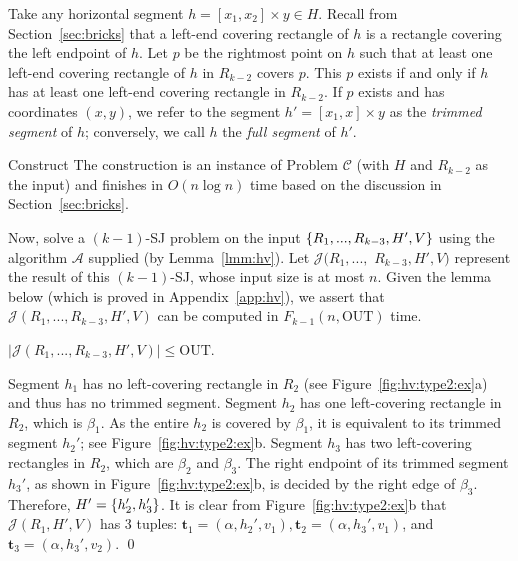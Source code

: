\documentclass[sigconf]{acmart}
\def\vgap{\vspace{0mm}}
\def\extraspacing{\vspace{1.5mm} \noindent}
\def\A{\mathcal{A}}
\def\J{\mathcal{J}}
\def\out{\mathrm{OUT}}
\begin{document}
{{{\extraspacing {\bf Set $\bm{H'}$.} Take any horizontal segment $h = [x_1, x_2] \times y \in H$. Recall from Section~\ref{sec:bricks} that a left-end covering rectangle of $h$ is a rectangle covering the left endpoint of $h$. 
Let $p$ be the rightmost point on $h$ such that at least one left-end covering rectangle of $h$ in $R_{k-2}$ covers $p$. This $p$ exists if and only if $h$ has at least one left-end covering rectangle in $R_{k-2}$. If $p$ exists and has coordinates $(x, y)$, we refer to the segment $h' = [x_1, x] \times y$ as the {\em trimmed segment} of $h$; conversely, we call $h$ the {\em full segment} of $h'$.

\vgap 

Construct
The construction is an instance of Problem $\mathscr{C}$ (with $H$ and $R_{k-2}$ as the input) and finishes in $O(n \log n)$ time based on the discussion in Section~\ref{sec:bricks}.

\vgap 

Now, solve a $(k-1)$-SJ problem on the input $\{R_1, ..., R_{k-3}, H', V\}$ using the algorithm $\A$ supplied (by Lemma~\ref{lmm:hv}). Let $\J(R_1, ...,$ $R_{k-3}, H', V)$ represent the result of this $(k-1)$-SJ, whose input size is at most $n$. Given the lemma below (which is proved in Appendix~\ref{app:hv}), we assert that $\J(R_1, ..., R_{k-3}, H', V)$ can be computed in $F_{k-1}(n, \out)$ time.

\begin{lemma} \label{lmm:hv:type2:recur-output}
    $|\J(R_1, ..., R_{k-3}, H', V)| \le \out$.
\end{lemma}

 Segment $h_1$ has no left-covering rectangle in $R_2$ (see Figure~\ref{fig:hv:type2:ex}a) and thus has no trimmed segment. Segment $h_2$ has one left-covering rectangle in $R_2$, which is $\beta_1$. As the entire $h_2$ is covered by $\beta_1$, it is equivalent to its trimmed segment $h_2'$; see Figure~\ref{fig:hv:type2:ex}b. Segment $h_3$ has two left-covering rectangles in $R_2$, which are $\beta_2$ and $\beta_3$. The right endpoint of its trimmed segment $h_3'$, as shown in Figure~\ref{fig:hv:type2:ex}b, is decided by the right edge of $\beta_3$. Therefore, $H' = \{h_2', h_3'\}$. It is clear from Figure~\ref{fig:hv:type2:ex}b that $\J(R_1, H', V)$ has 3 tuples: $\bm{t}_1 = (\alpha, h_2', v_1), \bm{t}_2 = (\alpha, h_3', v_1)$, and $\bm{t}_3 = (\alpha, h_3', v_2)$.
\qed

}}}
\end{document}
